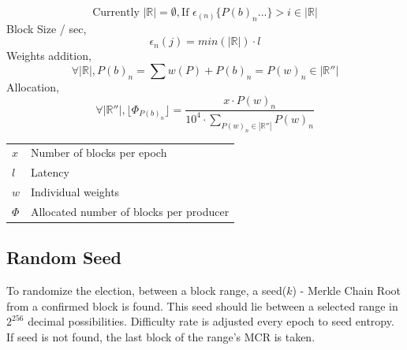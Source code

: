 \documentclass[a4paper,10pt]{article}
\makeatletter
\newenvironment{conditions}
  {\par\vspace{\abovedisplayskip}\noindent\begin{tabular}{>{$}l<{$} @{${}={}$} l}}
  {\end{tabular}\par\vspace{\belowdisplayskip}}
\makeatother
\begin{document}
\begin{equation*}
\text{Currently }|\mathbb{R}| = \emptyset, 
\text{If } \epsilon_{(n)}\{P(b)_n...\} > i \in |\mathbb{R}|
\end{equation*}
Block Size / sec,
\begin{equation*}
\epsilon_{n}(j)=min(|\mathbb{R}|) \cdot l
\end{equation*}
Weights addition,
\begin{equation*}
\forall |\mathbb{R}|, P(b)_n = \sum w(P) + P(b)_n = P(w)_n  \in |\mathbb{R}''|
\end{equation*}
Allocation,
\begin{equation*}
\forall |\mathbb{R}''|, \lfloor \Phi_{P(b)_n} \rfloor = \frac{x \cdot P(w)_n}{10^4 \cdot \sum_{P(w)_n \in |\mathbb{R}''|} P(w)_n}
\end{equation*}

\begin{conditions}
x & Number of blocks per epoch\\
l & Latency\\
w & Individual weights\\
\Phi & Allocated number of blocks per producer
\end{conditions}

\subsection{Random Seed}

To randomize the election, between a block range, a seed($k$) - Merkle Chain Root from a confirmed block is found. This seed should lie between a selected range in $2^{256}$ decimal possibilities. Difficulty rate is adjusted every epoch to seed entropy. If seed is not found, the last block of the range's MCR is taken. 
\end{document}
